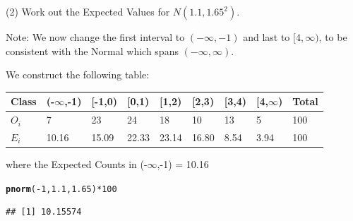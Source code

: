 \documentclass[t,xcolor=pdftex,dvipsnames,table]{beamer}\usepackage[]{graphicx}\usepackage[]{color}
\makeatletter
\newcommand{\hlnum}[1]{\textcolor[rgb]{0.686,0.059,0.569}{#1}}%
\newcommand{\hlopt}[1]{\textcolor[rgb]{0,0,0}{#1}}%
\newcommand{\hlstd}[1]{\textcolor[rgb]{0.345,0.345,0.345}{#1}}%
\newcommand{\hlkwd}[1]{\textcolor[rgb]{0.737,0.353,0.396}{\textbf{#1}}}%
\newenvironment{kframe}{%
 \def\at@end@of@kframe{}%
 \ifinner\ifhmode%
  \def\at@end@of@kframe{\end{minipage}}%
  \begin{minipage}{\columnwidth}%
 \fi\fi%
 \def\FrameCommand##1{\hskip\@totalleftmargin \hskip-\fboxsep
 \colorbox{shadecolor}{##1}\hskip-\fboxsep
     \hskip-\linewidth \hskip-\@totalleftmargin \hskip\columnwidth}%
 \MakeFramed {\advance\hsize-\width
   \@totalleftmargin\z@ \linewidth\hsize
   \@setminipage}}%
 {\par\unskip\endMakeFramed%
 \at@end@of@kframe}
\newenvironment{knitrout}{}{} %
\makeatother
\begin{document}
\begin{frame}[fragile]{}

(2) Work out the Expected Values for $N(1.1,1.65^2)$.

\vspace{.5cm}
Note: We now change the first interval to $(-\infty,-1)$ and last to $[4,\infty)$, to be consistent with the Normal which spans $(-\infty,\infty)$.

\vspace{.5cm}
We construct the following table:

\vspace{.5cm}
\begin{tabular}{l|lllllll|l} 
Class & (-$\infty$,-1) & [-1,0) & [0,1) & [1,2) & [2,3) & [3,4) & [4,$\infty$) & Total  \\ \hline
$O_{i}$ & 7 & 23 & 24 & 18 & 10 & 13 & 5 & 100    \\ \hline
$E_{i}$ & 10.16 & 15.09 & 22.33 & 23.14 & 16.80 & 8.54 & 3.94 & 100    \\ \hline
\end{tabular}

\vspace{.5cm}
where the Expected Counts in (-$\infty$,-1) = 10.16
\begin{knitrout}
\color{fgcolor}\begin{kframe}
\begin{alltt}
\hlkwd{pnorm}\hlstd{(}\hlopt{-}\hlnum{1}\hlstd{,}\hlnum{1.1}\hlstd{,}\hlnum{1.65}\hlstd{)}\hlopt{*}\hlnum{100}
\end{alltt}
\begin{verbatim}
## [1] 10.15574
\end{verbatim}
\end{kframe}
\end{knitrout}
\end{frame}
\end{document}
